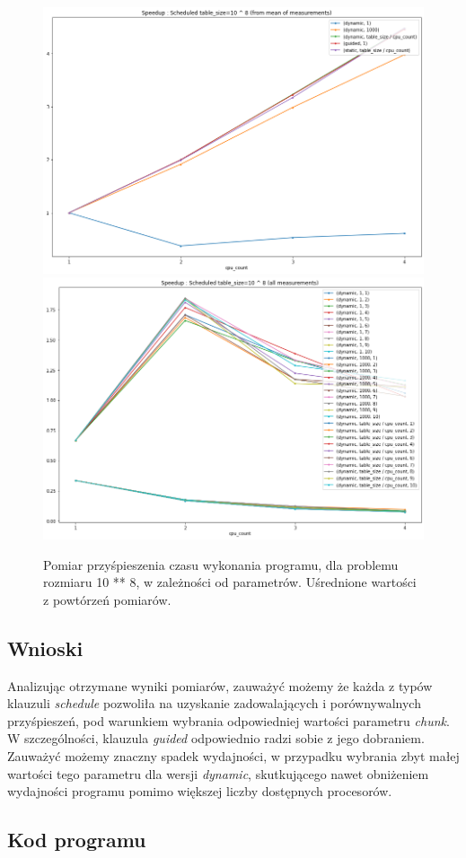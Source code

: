 \documentclass{article}
\begin{document}
        \begin{figure}[h!]
            \centering
            \includegraphics[width=17cm]{report2/images/TableSize/ex3_tb8_speedup.png}
            \includegraphics[width=17cm]{report2/images/TableSize/ex3_tb8_speedup_all.png}
            \caption{Pomiar przyśpieszenia czasu wykonania programu, dla problemu rozmiaru 10 ** 8, w zależności od parametrów. Uśrednione wartości z powtórzeń pomiarów. }
        \end{figure}


        \newpage
        \subsection{Wnioski}
        Analizując otrzymane wyniki pomiarów, zauważyć możemy że każda z typów klauzuli \textit{schedule} pozwoliła na uzyskanie zadowalających i porównywalnych przyśpieszeń, pod warunkiem wybrania odpowiedniej wartości parametru \textit{chunk}. W szczególności, klauzula \textit{guided} odpowiednio radzi sobie z jego dobraniem. Zauważyć możemy znaczny spadek wydajności, w przypadku wybrania zbyt małej wartości tego parametru dla wersji \textit{dynamic}, skutkującego nawet obniżeniem wydajności programu pomimo większej liczby dostępnych procesorów. 
        
        \subsection{Kod programu}
        
        
        
\end{document}
